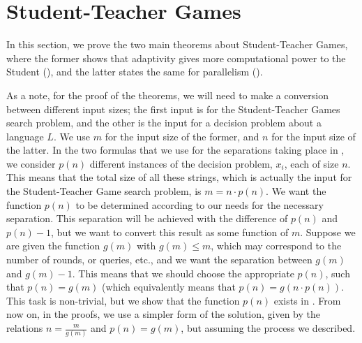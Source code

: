 \documentclass[11pt]{article}
\theoremstyle{definition}
\theoremstyle{definition}
\theoremstyle{remark}
\begin{document}
\section{Student-Teacher Games}\label{sec:stgames}

In this section, we prove the two main theorems about Student-Teacher Games, where the former shows that adaptivity gives more computational power to the Student (), and the latter states the same for parallelism ().

As a note, for the proof of the theorems, we will need to make a conversion between different input sizes; the first input is for the Student-Teacher Games search problem, and the other is the input for a decision problem about a language $L$. We use $m$ for the input size of the former, and $n$ for the input size of the latter. In the two formulas that we use for the separations taking place in , we consider $p(n)$ different instances of the decision problem, $x_i$, each of size $n$. This means that the total size of all these strings, which is actually the input for the Student-Teacher Game search problem, is $m=n\cdot p(n)$. We want the function $p(n)$ to be determined according to our needs for the necessary separation. This separation will be achieved with the difference of $p(n)$ and $p(n)-1$, but we want to convert this result as some function of $m$. Suppose we are given the function $g(m)$ with $g(m)\leq m$, which may correspond to the number of rounds, or queries, etc., and we want the separation between $g(m)$ and $g(m)-1$. This means that we should choose the appropriate $p(n)$, such that $p(n)=g(m)$ (which equivalently means that $p(n)=g(n\cdot p(n))$. This task is non-trivial, but we show that the function $p(n)$ exists in . From now on, in the proofs, we use a simpler form of the solution, given by the relations $n=\frac{m}{g(m)}$ and $p(n)=g(m)$, but assuming the process we described.
\end{document}
